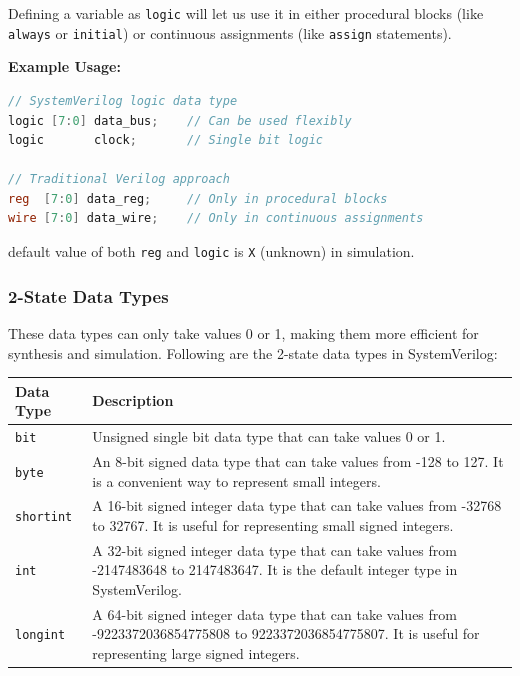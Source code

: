 \documentclass[12pt, a4paper]{article}
\begin{document}
\vspace{1em}

Defining a variable as \texttt{logic} will let us use it in either procedural blocks (like \texttt{always} or \texttt{initial}) or continuous assignments (like \texttt{assign} statements).

\textbf{Example Usage:}
\begin{lstlisting}[language=Verilog]
// SystemVerilog logic data type
logic [7:0] data_bus;    // Can be used flexibly
logic       clock;       // Single bit logic

// Traditional Verilog approach
reg  [7:0] data_reg;     // Only in procedural blocks  
wire [7:0] data_wire;    // Only in continuous assignments
\end{lstlisting}

default value of both \texttt{reg} and \texttt{logic} is \texttt{X} (unknown) in simulation.

\subsubsection{2-State Data Types}
These data types can only take values 0 or 1, making them more efficient for synthesis and simulation. Following are the 2-state data types in SystemVerilog:

\begin{center}
\begin{tabular}{|l|p{}|}
\hline
\textbf{Data Type} & \textbf{Description} \\
\hline
\texttt{bit} & Unsigned single bit data type that can take values 0 or 1. \\
\hline
\texttt{byte} & An 8-bit signed data type that can take values from -128 to 127. It is a convenient way to represent small integers. \\
\hline
\texttt{shortint} & A 16-bit signed integer data type that can take values from -32768 to 32767. It is useful for representing small signed integers. \\
\hline
\texttt{int} & A 32-bit signed integer data type that can take values from -2147483648 to 2147483647. It is the default integer type in SystemVerilog. \\
\hline
\texttt{longint} & A 64-bit signed integer data type that can take values from -9223372036854775808 to 9223372036854775807. It is useful for representing large signed integers. \\
\hline
\end{tabular}
\end{center}
\end{document}
